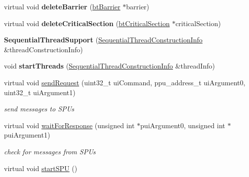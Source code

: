 \begin{DoxyCompactItemize}
virtual void {\bfseries delete\+Barrier} (\hyperlink{classbtBarrier}{bt\+Barrier} $\ast$barrier)
\item 
\mbox{\label{classSequentialThreadSupport_a0f50cbff72ad439a1d5377a062c03b71}} 
virtual void {\bfseries delete\+Critical\+Section} (\hyperlink{classbtCriticalSection}{bt\+Critical\+Section} $\ast$critical\+Section)
\item 
\mbox{\label{classSequentialThreadSupport_aee73c0902e906141dc87c918f61b51f1}} 
{\bfseries Sequential\+Thread\+Support} (\hyperlink{structSequentialThreadSupport_1_1SequentialThreadConstructionInfo}{Sequential\+Thread\+Construction\+Info} \&thread\+Construction\+Info)
\item 
\mbox{\label{classSequentialThreadSupport_a4fe5adac8ee34615c275544aef46de4a}} 
void {\bfseries start\+Threads} (\hyperlink{structSequentialThreadSupport_1_1SequentialThreadConstructionInfo}{Sequential\+Thread\+Construction\+Info} \&thread\+Info)
\item 
\mbox{\label{classSequentialThreadSupport_a3a10157e61b1fb4bfb4523f3838f8887}} 
virtual void \hyperlink{classSequentialThreadSupport_a3a10157e61b1fb4bfb4523f3838f8887}{send\+Request} (uint32\+\_\+t ui\+Command, ppu\+\_\+address\+\_\+t ui\+Argument0, uint32\+\_\+t ui\+Argument1)
\begin{DoxyCompactList}\small\item\em send messages to S\+P\+Us \end{DoxyCompactList}\item 
\mbox{\label{classSequentialThreadSupport_a490aef03d34d44531031e76c016be2e5}} 
virtual void \hyperlink{classSequentialThreadSupport_a490aef03d34d44531031e76c016be2e5}{wait\+For\+Response} (unsigned int $\ast$pui\+Argument0, unsigned int $\ast$pui\+Argument1)
\begin{DoxyCompactList}\small\item\em check for messages from S\+P\+Us \end{DoxyCompactList}\item 
\mbox{\label{classSequentialThreadSupport_afc75495b1786473811defc9bbbbb720b}} 
virtual void \hyperlink{classSequentialThreadSupport_afc75495b1786473811defc9bbbbb720b}{start\+S\+PU} ()

\end{DoxyCompactItemize}
